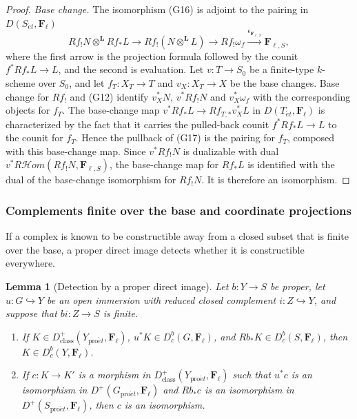 \documentclass[11pt,a4paper]{article}
\numberwithin{equation}{section}
\newtheorem{lemma}[theorem]{Lemma}
\theoremstyle{definition}
\theoremstyle{remark}
\newcommand{\Dbc}{D^b_c}
\newcommand{\cHom}{R\mathcal{H}\!om}
\newcommand{\Fell}{\mathbf F_\ell}
\newcommand{\et}{\acute{e}t}
\newcommand{\proet}{\mathrm{pro}\acute{e}t}
\begin{document}
\begin{proof}
\emph{Base change.} The isomorphism (G16) is adjoint to the pairing
in \(D(S_{\et},\Fell)\)
\[
 Rf_!N\otimes^{\mathbf L}Rf_*L
  \longrightarrow Rf_!(N\otimes^{\mathbf L}L)
  \longrightarrow Rf_!\omega_f
  \xrightarrow{\epsilon_{\mathbf F_{\ell,S}}}\mathbf F_{\ell,S},               \tag{G17}
\]
where the first arrow is the projection formula followed by the counit
\(f^*Rf_*L\to L\), and the second is evaluation. Let \(v:T\to S_0\) be a
finite-type $k$-scheme over \(S_0\), and let \(f_T:X_T\to T\) and
\(v_X:X_T\to X\) be the base changes. Base change for \(Rf_!\) and (G12)
identify \(v_X^*N\), \(v^*Rf_!N\) and \(v_X^*\omega_f\) with the
corresponding objects for \(f_T\). The base-change map
\(v^*Rf_*L\to Rf_{T,*}v_X^*L\) in \(D(T_{\et},\Fell)\) is characterized by the fact that it
carries the pulled-back counit \(f^*Rf_*L\to L\) to the counit for
\(f_T\). Hence the pullback of (G17) is the pairing for \(f_T\),
composed with this base-change map. Since \(v^*Rf_!N\) is dualizable
with dual \(v^*\cHom(Rf_!N,\mathbf F_{\ell,S})\), the base-change map
for \(Rf_*L\) is identified with the dual of the base-change
isomorphism for \(Rf_!N\). It is therefore an isomorphism.
\end{proof}

\subsubsection{Complements finite over the base and coordinate projections}

If a complex is known to be constructible away from a closed subset
that is finite over the base, a proper direct image detects whether it
is constructible everywhere.

\begin{lemma}[Detection by a proper direct image]
\label{b:lem:geo-finite-boundary}
Let \(b:Y\to S\) be proper, let \(u:G\hookrightarrow Y\) be an open
immersion with reduced closed complement \(i:Z\hookrightarrow Y\), and
suppose that \(bi:Z\to S\) is finite.
\begin{enumerate}
\item If \(K\in D^+_{\mathrm{class}}(Y_{\proet},\Fell)\), \(u^*K\in\Dbc(G,\Fell)\), and
\(Rb_*K\in\Dbc(S,\Fell)\), then \(K\in\Dbc(Y,\Fell)\).
\item If \(c:K\to K'\) is a morphism in \(D^+_{\mathrm{class}}(Y_{\proet},\Fell)\) such
that \(u^*c\) is an isomorphism in \(D^+(G_{\proet},\Fell)\) and
\(Rb_*c\) is an isomorphism in \(D^+(S_{\proet},\Fell)\), then \(c\) is an
isomorphism.
\end{enumerate}
\end{lemma}
\end{document}

